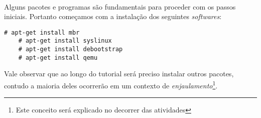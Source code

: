 \documentclass[a4paper,10pt]{article}
\begin{document}
    \paragraph{}
    Alguns pacotes e programas são fundamentais para proceder com os passos iniciais. Portanto começamos 
    com a instalação dos seguintes \emph{softwares}:
      \begin{lstlisting}[frame=single]
	# apt-get install mbr
	# apt-get install syslinux
	# apt-get install debootstrap
	# apt-get install qemu
      \end{lstlisting}
    Vale observar que ao longo do tutorial será preciso instalar outros pacotes, contudo a maioria deles 
    ocorrerão em um contexto de \emph{enjaulamento}\footnote{Este conceito será explicado no decorrer das 
    atividades}. 

\end{document}
